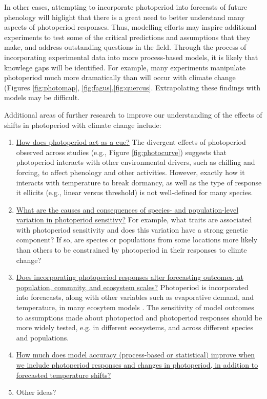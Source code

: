 \documentclass{article}
\begin{document}
\par In other cases, attempting to incorporate photoperiod into forecasts of future phenology will higlight that there is a great need to better understand many aspects of photoperiod responses. Thus, modelling efforts may inspire additional experiments to test some of the critical predictions and assumptions that they make, and address outstanding questions in the field. Through the process of incorporating experimental data into more process-based models, it is likely that knowlege gaps will be identified. For example, many experiments manipulate photoperiod much more dramatically than will occur with climate change (Figures \ref{fig:photomap}, \ref{fig:fagus},\ref{fig:quercus}. Extrapolating these findings with models may be difficult. 
\par Additional areas of further research to improve our understanding of the effects of shifts in photoperiod with climate change include:
\begin{enumerate}
\item \underline{How does photoperiod act as a cue?} The divergent effects of photoperiod observed across studies (e.g., Figure \ref{fig:photocurve}) suggests that photoperiod interacts with other environmental drivers, such as chilling and forcing, to affect phenology and other activities. However, exactly how it interacts with temperature to break dormancy, as well as the type of response it ellicits (e.g., linear versus threshold) is not well-defined for many species.  
\item \underline{What are the causes and consequences of species- and population-level variation in photoperiod sensitivy?} For example, what traits are associated with photoperiod sensitivity and does this variation have a strong genetic component? If so, are species or populations from some locations more likely than others to be constrained by photoperiod in their responses to climte change?

\item \underline{Does incorporating photoperiod responses alter forecasting outcomes, at population, commnity, and ecosystem scales?}  Photoperiod is incorporated into foreacasts, along with other variables such as evaporative demand, and temperature, in many ecosytem models \citep [e.g. ED] []{jolly2005, medvigy2013}. The sensitivity of model outcomes to assumptions made about photoperiod and photoperiod responses should be more widely tested, e.g. in different ecosystems, and across different species and populations.
\item \underline{How much does model accuracy (process-based or statistical) improve when we include photoperiod responses and changes in photoperiod, in addition to forecasted temperature shifts?}
\item Other ideas?
\end{enumerate}
\end{document}
